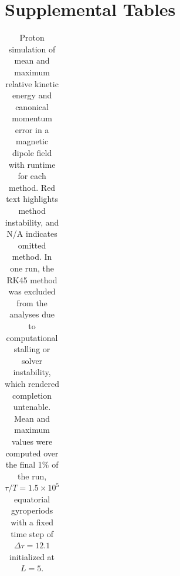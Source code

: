 \documentclass[draft]{agujournal2019}
\begin{document}
\section{Supplemental Tables}\label{appendix:tables}
\renewcommand{\thetable}{B.\arabic{table}}

\begin{table}[h]
\setlength{\extrarowheight}{2pt}
\centering
\caption{Proton simulation of mean and maximum relative kinetic energy and canonical momentum error in a magnetic dipole field with runtime for each method. Red text highlights method instability, and N/A indicates omitted method. In one run, the RK45 method was excluded from the analyses due to computational stalling or solver instability, which rendered completion untenable. Mean and maximum values were computed over the final 1\% of the run, $\tau/T=1.5\times 10^5$ equatorial gyroperiods with a fixed time step of $\Delta\tau=12.1$ initialized at $L=5$.}
\label{tab:proton_energy_results}
\setlength{\tabcolsep}{4pt}  
\begin{tabular}{|c|c|c|c|c|c|}
\hline


\end{tabular}
\end{table}
\end{document}

